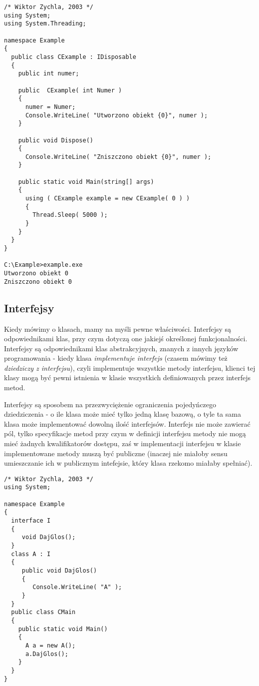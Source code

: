 \begin{scriptsize}
\begin{verbatim}
/* Wiktor Zychla, 2003 */
using System;
using System.Threading;

namespace Example
{
  public class CExample : IDisposable
  {
    public int numer;

    public  CExample( int Numer )
    {
      numer = Numer;
      Console.WriteLine( "Utworzono obiekt {0}", numer );
    }

    public void Dispose()
    {
      Console.WriteLine( "Zniszczono obiekt {0}", numer );
    }

    public static void Main(string[] args)
    {
      using ( CExample example = new CExample( 0 ) )
      {
        Thread.Sleep( 5000 );
      }
    }
  }
}

C:\Example>example.exe
Utworzono obiekt 0
Zniszczono obiekt 0
\end{verbatim}
\end{scriptsize}

\subsection{Interfejsy}

Kiedy mówimy o klasach, mamy na myśli pewne właściwości. Interfejsy są odpowiednikami klas, przy czym
dotyczą one jakiejś określonej funkcjonalności. Interfejsy są odpowiednikami klas abstrakcyjnych, znanych
z innych języków programowania - kiedy klasa {\em implementuje interfejs} (czasem mówimy też {\em dziedziczy
z interfejsu}), czyli implementuje wszystkie metody interfejsu, klienci tej klasy mogą być pewni istnienia
w klasie wszystkich definiowanych przez interfejs metod.

Interfejsy są sposobem na przezwyciężenie ograniczenia pojedyńczego dziedziczenia - o ile
klasa może mieć tylko jedną klasę bazową, o tyle ta sama klasa może implementować dowolną ilość interfejsów.
Interfejs nie może zawierać pól, tylko specyfikacje metod przy czym w definicji interfejsu metody nie
mogą mieć żadnych kwalifikatorów dostępu, zaś w implementacji interfejsu w klasie implementowane metody
muszą być publiczne (inaczej nie miałoby sensu umieszczanie ich w publicznym intefejsie, który klasa
rzekomo miałaby spełniać).

\begin{scriptsize}
\begin{verbatim}
/* Wiktor Zychla, 2003 */
using System;

namespace Example
{
  interface I
  {
     void DajGlos();
  }
  class A : I
  {
     public void DajGlos()
     {
        Console.WriteLine( "A" );
     }
  }
  public class CMain
  {    
    public static void Main()
    {
      A a = new A();
      a.DajGlos();
    }
  }
}
\end{verbatim}
\end{scriptsize}

